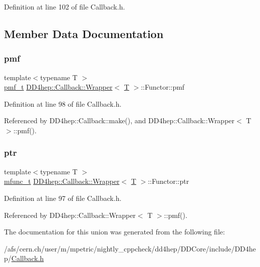 Definition at line 102 of file Callback.\+h.



\subsection{Member Data Documentation}
\hypertarget{union_d_d4hep_1_1_callback_1_1_wrapper_1_1_functor_afbf0fb7951a0a816b42866d0492628d3}{}\label{union_d_d4hep_1_1_callback_1_1_wrapper_1_1_functor_afbf0fb7951a0a816b42866d0492628d3} 
\subsubsection{\texorpdfstring{pmf}{pmf}}
{\footnotesize\ttfamily template$<$typename T $>$ \\
\hyperlink{class_d_d4hep_1_1_callback_1_1_wrapper_ab266379df9f395d1221b2adbf62b112c}{pmf\+\_\+t} \hyperlink{class_d_d4hep_1_1_callback_1_1_wrapper}{D\+D4hep\+::\+Callback\+::\+Wrapper}$<$ \hyperlink{class_t}{T} $>$\+::Functor\+::pmf}



Definition at line 98 of file Callback.\+h.



Referenced by D\+D4hep\+::\+Callback\+::make(), and D\+D4hep\+::\+Callback\+::\+Wrapper$<$ T $>$\+::pmf().

\hypertarget{union_d_d4hep_1_1_callback_1_1_wrapper_1_1_functor_aa729847f113eb9d2b69d7fd602c50f77}{}\label{union_d_d4hep_1_1_callback_1_1_wrapper_1_1_functor_aa729847f113eb9d2b69d7fd602c50f77} 
\subsubsection{\texorpdfstring{ptr}{ptr}}
{\footnotesize\ttfamily template$<$typename T $>$ \\
\hyperlink{struct_d_d4hep_1_1_callback_1_1mfunc__t}{mfunc\+\_\+t} \hyperlink{class_d_d4hep_1_1_callback_1_1_wrapper}{D\+D4hep\+::\+Callback\+::\+Wrapper}$<$ \hyperlink{class_t}{T} $>$\+::Functor\+::ptr}



Definition at line 97 of file Callback.\+h.



Referenced by D\+D4hep\+::\+Callback\+::\+Wrapper$<$ T $>$\+::pmf().



The documentation for this union was generated from the following file\+:\begin{DoxyCompactItemize}
\item 
/afs/cern.\+ch/user/m/mpetric/nightly\+\_\+cppcheck/dd4hep/\+D\+D\+Core/include/\+D\+D4hep/\hyperlink{_callback_8h}{Callback.\+h}\end{DoxyCompactItemize}
